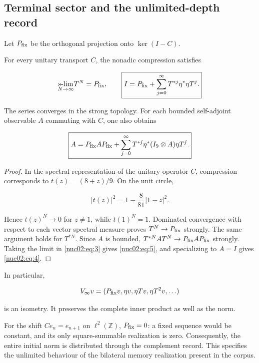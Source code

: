 \subsection{Terminal sector and the unlimited-depth record}

Let \(P_{\rm fix}\) be the orthogonal projection onto \(\ker(I-C)\).

\begin{theorem}
For every unitary transport \(C\), the nonadic compression satisfies

\begin{equation}
\underset{N\to\infty}{\operatorname{s-lim}}T^N=P_{\rm fix},\qquad
\boxed{I=P_{\rm fix}+\sum_{j=0}^{\infty}T^{*j}\eta^*\eta T^j.}\label{nuc02:eq:4}
\end{equation}

The series converges in the strong topology. For each bounded self-adjoint observable \(A\) commuting with \(C\), one also obtains

\begin{equation}
\boxed{A=P_{\rm fix}AP_{\rm fix}
+\sum_{j=0}^{\infty}T^{*j}\eta^*(I_9\otimes A)\eta T^j.}\label{nuc02:eq:5}
\end{equation}
\end{theorem}

\begin{proof}
In the spectral representation of the unitary operator \(C\), compression corresponds to \(t(z)=(8+z)/9\). On the unit circle,

\[
|t(z)|^2=1-\frac8{81}|1-z|^2.
\]

Hence \(t(z)^N\to0\) for \(z\ne1\), while \(t(1)^N=1\). Dominated convergence with respect to each vector spectral measure proves \(T^N\to P_{\rm fix}\) strongly. The same argument holds for \(T^{*N}\). Since \(A\) is bounded, \(T^{*N}AT^N\to P_{\rm fix}AP_{\rm fix}\) strongly. Taking the limit in \eqref{nuc02:eq:3} gives \eqref{nuc02:eq:5}, and specializing to \(A=I\) gives \eqref{nuc02:eq:4}.
\end{proof}

In particular,

\[
V_\infty v=(P_{\rm fix}v,\eta v,\eta Tv,\eta T^2v,\ldots)
\]

is an isometry. It preserves the complete inner product as well as the norm.

\begin{corollary}
For the shift \(Ce_n=e_{n+1}\) on \(\ell^2(\mathbb Z)\), \(P_{\rm fix}=0\): a fixed sequence would be constant, and its only square-summable realization is zero. Consequently, the entire initial norm is distributed through the complement record. This specifies the unlimited behaviour of the bilateral memory realization present in the corpus.
\end{corollary}

